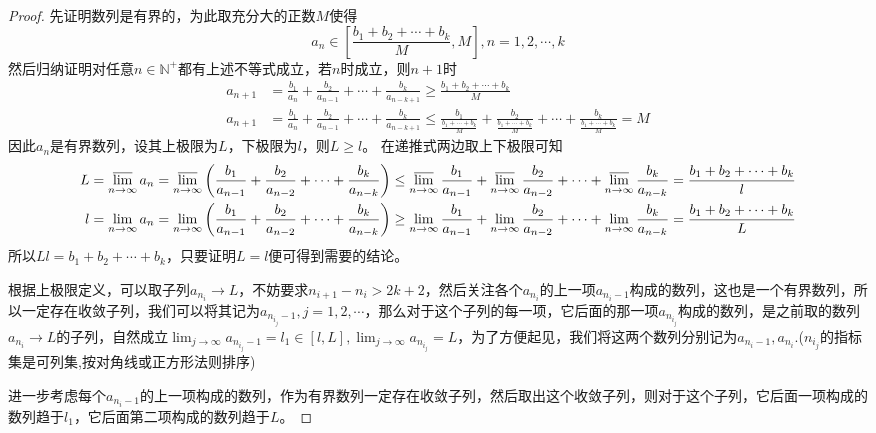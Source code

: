 \documentclass[lang=cn,newtx,10pt,scheme=chinese]{elegantbook}
\begin{document}
\begin{proof}
先证明数列是有界的，为此取充分大的正数\(M\)使得
\[a_n\in\left[\frac{b_1 + b_2+\cdots + b_k}{M},M\right],n = 1,2,\cdots,k\]
然后归纳证明对任意\(n\in\mathbb{N}^+\)都有上述不等式成立，若\(n\)时成立，则\(n + 1\)时
\begin{align*}
a_{n + 1}&=\frac{b_1}{a_n}+\frac{b_2}{a_{n - 1}}+\cdots+\frac{b_k}{a_{n - k+1}}\geq\frac{b_1 + b_2+\cdots + b_k}{M}\\
a_{n + 1}&=\frac{b_1}{a_n}+\frac{b_2}{a_{n - 1}}+\cdots+\frac{b_k}{a_{n - k+1}}\leq\frac{b_1}{\frac{b_1 + \cdots + b_k}{M}}+\frac{b_2}{\frac{b_1 + \cdots + b_k}{M}}+\cdots+\frac{b_k}{\frac{b_1 + \cdots + b_k}{M}}=M
\end{align*}
因此\(a_n\)是有界数列，设其上极限为\(L\)，下极限为\(l\)，则\(L\geq l\)。
在递推式两边取上下极限可知
\begin{align*}
L&=\varlimsup_{n\rightarrow\infty}a_n=\varlimsup_{n\rightarrow\infty}\left(\frac{b_1}{a_{n - 1}}+\frac{b_2}{a_{n - 2}}+\cdots+\frac{b_k}{a_{n - k}}\right)\leq\varlimsup_{n\rightarrow\infty}\frac{b_1}{a_{n - 1}}+\varlimsup_{n\rightarrow\infty}\frac{b_2}{a_{n - 2}}+\cdots+\varlimsup_{n\rightarrow\infty}\frac{b_k}{a_{n - k}}=\frac{b_1 + b_2+\cdots + b_k}{l}\\
l&=\lim_{n\rightarrow\infty}a_n=\lim_{n\rightarrow\infty}\left(\frac{b_1}{a_{n - 1}}+\frac{b_2}{a_{n - 2}}+\cdots+\frac{b_k}{a_{n - k}}\right)\geq\lim_{n\rightarrow\infty}\frac{b_1}{a_{n - 1}}+\lim_{n\rightarrow\infty}\frac{b_2}{a_{n - 2}}+\cdots+\lim_{n\rightarrow\infty}\frac{b_k}{a_{n - k}}=\frac{b_1 + b_2+\cdots + b_k}{L}
\end{align*}
所以\(Ll=b_1 + b_2+\cdots + b_k\)，只要证明\(L = l\)便可得到需要的结论。

根据上极限定义，可以取子列\(a_{n_i}\to L\)，不妨要求\(n_{i + 1}-n_i>2k + 2\)，然后关注各个\(a_{n_i}\)的上一项\(a_{n_i - 1}\)构成的数列，这也是一个有界数列，所以一定存在收敛子列，我们可以将其记为\(a_{n_{i_j}-1},j = 1,2,\cdots\)，那么对于这个子列的每一项，它后面的那一项\(a_{n_{i_j}}\)构成的数列，是之前取的数列\(a_{n_i}\to L\)的子列，自然成立\(\lim_{j\rightarrow\infty}a_{n_{i_j}-1}=l_1\in[l,L],\lim_{j\rightarrow\infty}a_{n_{i_j}} = L\)，为了方便起见，我们将这两个数列分别记为\(a_{n_{i}-1},a_{n_{i}}\).($n_{i_j}$的指标集是可列集,按对角线或正方形法则排序)

进一步考虑每个\(a_{n_{i}-1}\)的上一项构成的数列，作为有界数列一定存在收敛子列，然后取出这个收敛子列，则对于这个子列，它后面一项构成的数列趋于\(l_1\)，它后面第二项构成的数列趋于\(L\)。


\end{proof}
\end{document}
